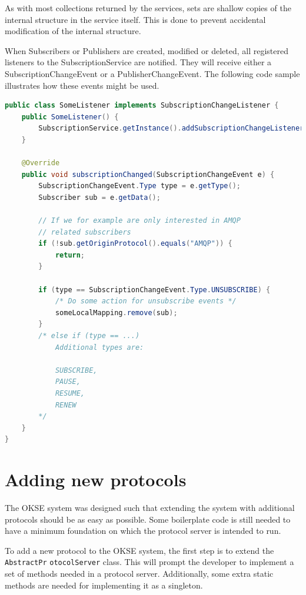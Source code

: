 As with most collections returned by the services, sets are shallow copies of the internal structure in the service itself. This is done to prevent accidental modification of the internal structure.

When Subscribers or Publishers are created, modified or deleted, all registered listeners to the SubscriptionService are notified. They will receive either a SubscriptionChangeEvent or a PublisherChangeEvent. The following code sample illustrates how these events might be used.

\begin{lstlisting}[language=Java, captionpos=b, caption=Use of the SubscriptionService listener support, frame=bt, showstringspaces=false]
public class SomeListener implements SubscriptionChangeListener {
    public SomeListener() {
        SubscriptionService.getInstance().addSubscriptionChangeListener(this);
    }
    
    @Override
    public void subscriptionChanged(SubscriptionChangeEvent e) {
        SubscriptionChangeEvent.Type type = e.getType();
        Subscriber sub = e.getData();
        
        // If we for example are only interested in AMQP
        // related subscribers
        if (!sub.getOriginProtocol().equals("AMQP")) {
            return;
        }
        
        if (type == SubscriptionChangeEvent.Type.UNSUBSCRIBE) {
            /* Do some action for unsubscribe events */
            someLocalMapping.remove(sub);
        }
        /* else if (type == ...)
            Additional types are:
            
            SUBSCRIBE,
            PAUSE,
            RESUME,
            RENEW
        */
    }
}
\end{lstlisting}

\section{Adding new protocols}
\label{sec:adding-new-protocols}

The OKSE system was designed such that extending the system with additional protocols should be as easy as possible. Some boilerplate code is still needed to have a minimum foundation on which the protocol server is intended to run.

To add a new protocol to the OKSE system, the first step is to extend the \verb!AbstractPr! \verb!otocolServer! class. This will prompt the developer to implement a set of methods needed in a protocol server. Additionally, some extra static methods are needed for implementing it as a singleton.

